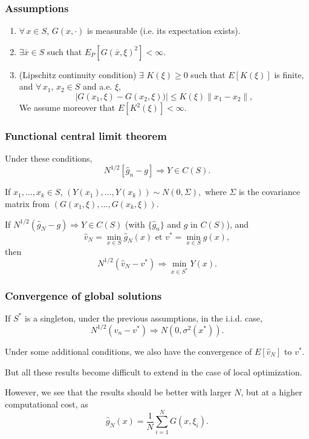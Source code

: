 \documentclass{beamer}
\begin{document}
\begin{frame}
\frametitle{Assumptions}

\begin{enumerate}
\item
$\forall\, x \in S$, $G(x,\cdot)$ is measurable (i.e. its expectation exists).
\item
$\exists \overline{x} \in S$ such that $E_P[G(\overline{x}, \xi)^2] < \infty$.
\item
(Lipschitz continuity condition) 
$\exists$ $K(\xi) \geq 0$ such that $E[K(\xi)]$ is finite, and
$\forall\, x_1$, $x_2 \in S$ and a.e. $\xi$,
\[
| G(x_1, \xi) - G(x_2, \xi) )| \leq K(\xi) \| x_1 - x_2\|,
\]
We assume moreover that $E[K^2(\xi)] < \infty$.%
\end{enumerate}

\end{frame}

\begin{frame}
\frametitle{Functional central limit theorem}

Under these conditions,
\[
N^{1/2} [\hat{g}_n - g] \Rightarrow Y \in C(S).
\]

\mbox{}

If $x_1,\ldots,x_k \in S$, %
$
(Y(x_1),\ldots,Y(x_k)) \sim N(0, \Sigma),
$
where $\Sigma$ is the covariance matrix from $(G(x_1, \xi), \ldots, G(x_k, \xi))$.

\mbox{}

If $N^{1/2}(\hat{g}_N - g) \Rightarrow Y \in C(S)$ (with $\lbrace \hat{g}_n \rbrace$ and $g$ in $C(S)$), and
\[
\hat{v}_N = \min_{x \in S} \hat{g}_N(x) \mbox{ et } v^*= \min_{x \in S} g(x),
\]
then
\[
N^{1/2}(\hat{v}_N - v^*) \Rightarrow \min_{x \in S^*} Y(x).
\]

\end{frame}

\begin{frame}
\frametitle{Convergence of global solutions}

If $S^*$ is a singleton, under the previous assumptions, in the i.i.d. case,
\[
N^{1/2}(\hat{v}_n - v^*) \Rightarrow N(0, \sigma^2(x^*) ).
\]

\mbox{}

Under some additional conditions, we also have the convergence of $E[\hat{v}_N]$ to $v^*$.

\mbox{}

But all these results become difficult to extend in the case of local optimization.

\mbox{}

However, we see that the results should be better with larger $N$, but at a higher computational cost, as
$$
\hat{g}_N(x) = \frac{1}{N} \sum_{i = 1}^N G (x, \xi_i).
$$

\end{frame}
\end{document}
